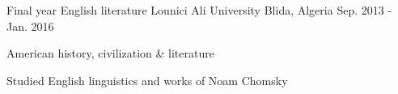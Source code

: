 

\begin{cventries}

  \cventry
    {Final year English literature} %
    {Lounici Ali University} %
    {Blida, Algeria} %
    {Sep. 2013 - Jan. 2016} %
    {
      \begin{cvitems} %
        \item {American history, civilization \& literature}
        \item {Studied English linguistics and works of Noam Chomsky}
      \end{cvitems}
    }

\end{cventries}

